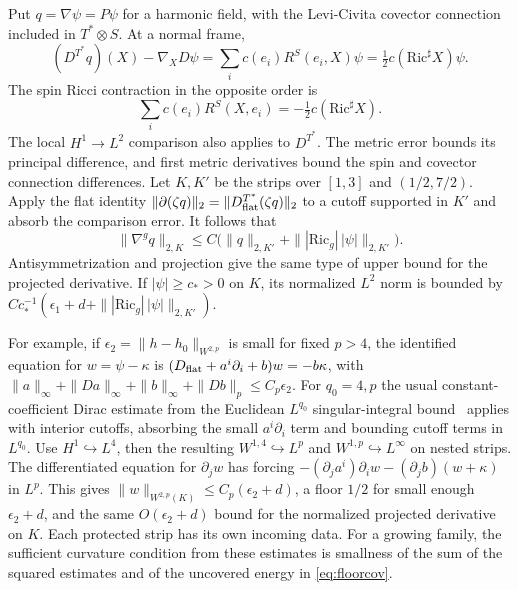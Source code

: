 \documentclass[11pt]{article}
\theoremstyle{remark}
\newcommand{\Ric}{\mathrm{Ric}}
\begin{document}
Put \(q=\nabla\psi=P\psi\) for a harmonic field, with the Levi-Civita covector connection included in \(T^*\otimes S\). At a normal frame,
\begin{equation}
 (D^{T^*}q)(X)-\nabla_X D\psi
   =\sum_i c(e_i)R^S(e_i,X)\psi
   =\tfrac12 c(\Ric^\sharp X)\psi .
 \label{eq:ricciforcing}
\end{equation}
The spin Ricci contraction in the opposite order is
\[\sum_i c(e_i)R^S(X,e_i)=-\tfrac12 c(\Ric^\sharp X).\] The local \(H^1\to L^2\) comparison also applies to \(D^{T^*}\). The metric error bounds its principal difference, and first metric derivatives bound the spin and covector connection differences. Let \(K,K'\) be the strips over \([1,3]\) and \((1/2,7/2)\). Apply the flat identity \(\|\partial(\zeta q)\|_2=\|D_{\rm flat}^{T^*}(\zeta q)\|_2\) to a cutoff supported in \(K'\) and absorb the comparison error. It follows that
\begin{equation}
 \|\nabla^gq\|_{2,K}\le C\bigl(\|q\|_{2,K'}+\||\Ric_g|\,|\psi|\|_{2,K'}\bigr).
 \label{eq:localRicci}
\end{equation}
Antisymmetrization and projection give the same type of upper bound for the projected derivative. If \(|\psi|\ge c_*>0\) on \(K\), its normalized \(L^2\) norm is bounded by \(C c_*^{-1}(\epsilon_1+d+\||\Ric_g|\,|\psi|\|_{2,K'})\).

For example, if \(\epsilon_2=\|h-h_0\|_{W^{2,p}}\) is small for fixed \(p>4\), the identified equation for \(w=\psi-\kappa\) is
\((D_{\rm flat}+a^i\partial_i+b)w=-b\kappa\), with \(\|a\|_\infty+\|Da\|_\infty+\|b\|_\infty+\|Db\|_p\le C_p\epsilon_2\). For \(q_0=4,p\) the usual constant-coefficient Dirac estimate from the Euclidean \(L^{q_0}\) singular-integral bound~\cite[Chapter~I]{CalderonZygmund1952Singular} applies with interior cutoffs, absorbing the small \(a^i\partial_i\) term and bounding cutoff terms in \(L^{q_0}\). Use \(H^1\hookrightarrow L^4\), then the resulting \(W^{1,4}\hookrightarrow L^p\) and \(W^{1,p}\hookrightarrow L^\infty\) on nested strips. The differentiated equation for \(\partial_j w\) has forcing \(-(\partial_j a^i)\partial_i w-(\partial_j b)(w+\kappa)\) in \(L^p\). This gives \(\|w\|_{W^{2,p}(K)}\le C_p(\epsilon_2+d)\), a floor \(1/2\) for small enough \(\epsilon_2+d\), and the same \(O(\epsilon_2+d)\) bound for the normalized projected derivative on \(K\). Each protected strip has its own incoming data. For a growing family, the sufficient curvature condition from these estimates is smallness of the sum of the squared estimates and of the uncovered energy in \eqref{eq:floorcov}.
\end{document}
